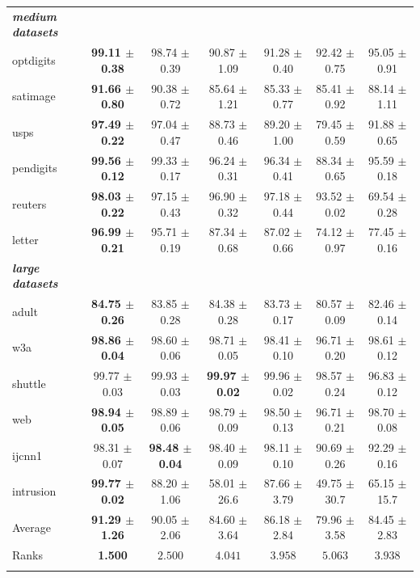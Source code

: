 \documentclass[reqno]{vcuthesis}
\numberwithin{equation}{chapter}
\begin{document}
\begin{table}[t!]
\begin{tabularx}{\textwidth}{l@{\extracolsep{\fill}}cccccc}
\textbf{\textit{medium datasets}} & & & & & & \\
optdigits & \textbf{99.11 $\pm$ 0.38} & 98.74 $\pm$ 0.39 & 90.87 $\pm$ 1.09 & 91.28 $\pm$ 0.40 & 92.42 $\pm$ 0.75 & 95.05 $\pm$ 0.91 \\
satimage & \textbf{91.66 $\pm$ 0.80} & 90.38 $\pm$ 0.72 & 85.64 $\pm$ 1.21 & 85.33 $\pm$ 0.77 & 85.41 $\pm$ 0.92 & 88.14 $\pm$ 1.11 \\
usps & \textbf{97.49 $\pm$ 0.22} & 97.04 $\pm$ 0.47 & 88.73 $\pm$ 0.46 & 89.20 $\pm$ 1.00 & 79.45 $\pm$ 0.59 & 91.88 $\pm$ 0.65 \\
pendigits & \textbf{99.56 $\pm$ 0.12} & 99.33 $\pm$ 0.17 & 96.24 $\pm$ 0.31 & 96.34 $\pm$ 0.41 & 88.34 $\pm$ 0.65 & 95.59 $\pm$ 0.18 \\
reuters & \textbf{98.03 $\pm$ 0.22} & 97.15 $\pm$ 0.43 & 96.90 $\pm$ 0.32 & 97.18 $\pm$ 0.44 & 93.52 $\pm$ 0.02 & 69.54 $\pm$ 0.28 \\
letter & \textbf{96.99 $\pm$ 0.21} & 95.71 $\pm$ 0.19 & 87.34 $\pm$ 0.68 & 87.02 $\pm$ 0.66 & 74.12 $\pm$ 0.97 & 77.45 $\pm$ 0.16 \\
\textbf{\textit{large datasets}} & & & & & & \\
adult & \textbf{84.75 $\pm$ 0.26} & 83.85 $\pm$ 0.28 & 84.38 $\pm$ 0.28 & 83.73 $\pm$ 0.17 & 80.57 $\pm$ 0.09 & 82.46 $\pm$ 0.14 \\
w3a & \textbf{98.86 $\pm$ 0.04} & 98.60 $\pm$ 0.06 & 98.71 $\pm$ 0.05 & 98.41 $\pm$ 0.10 & 96.71 $\pm$ 0.20 & 98.61 $\pm$ 0.12 \\
shuttle & 99.77 $\pm$ 0.03 & 99.93 $\pm$ 0.03 & \textbf{99.97 $\pm$ 0.02} & 99.96 $\pm$ 0.02 & 98.57 $\pm$ 0.24 & 96.83 $\pm$ 0.12 \\
web & \textbf{98.94 $\pm$ 0.05} & 98.89 $\pm$ 0.06 & 98.79 $\pm$ 0.09 & 98.50 $\pm$ 0.13 & 96.71 $\pm$ 0.21 & 98.70 $\pm$ 0.08 \\
ijcnn1 & 98.31 $\pm$ 0.07 & \textbf{98.48 $\pm$ 0.04} & 98.40 $\pm$ 0.09 & 98.11 $\pm$ 0.10 & 90.69 $\pm$ 0.26 & 92.29 $\pm$ 0.16 \\
intrusion & \textbf{99.77 $\pm$ 0.02} & 88.20 $\pm$ 1.06 & 58.01 $\pm$ 26.6 & 87.66 $\pm$ 3.79 & 49.75 $\pm$ 30.7 & 65.15 $\pm$ 15.7 \\
\noalign{\smallskip}\hline\noalign{\smallskip}
Average & \textbf{91.29 $\pm$ 1.26} & 90.05 $\pm$ 2.06 & 84.60 $\pm$ 3.64 & 86.18 $\pm$ 2.84 & 79.96 $\pm$ 3.58 & 84.45 $\pm$ 2.83 \\
Ranks & \textbf{1.500} & $2.500$ & $4.041$ & $3.958$ & $5.063$ & $3.938$ \\
\noalign{\smallskip}\hline\noalign{\smallskip}
\end{tabularx}
\begin{minipage}{0.9\textwidth}
\centering
{}
\end{minipage}
\end{table}
\end{document}
